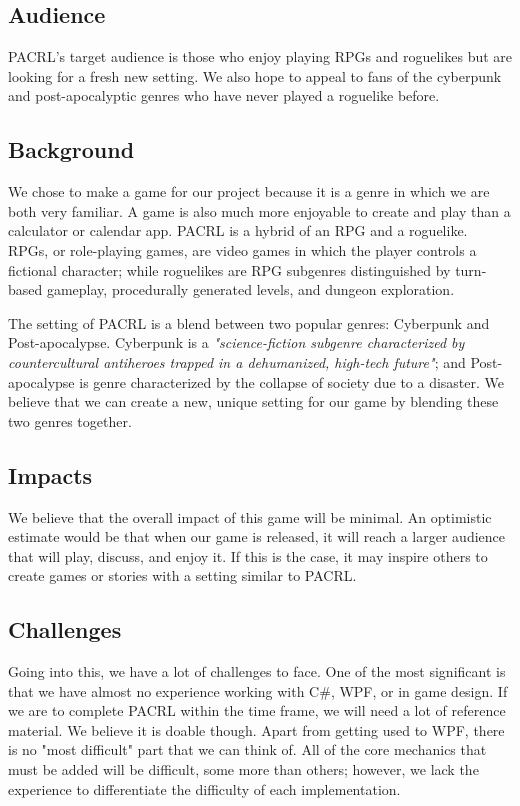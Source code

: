 \documentclass[10pt,conference,onecolumn,compsoc]{IEEEtran}
\begin{document}
\subsection{Audience}
PACRL's target audience is those who enjoy playing RPGs and roguelikes but are looking for a fresh new setting. We also hope to appeal to fans of the cyberpunk and post-apocalyptic genres who have never played a roguelike before. 


\subsection{Background}
We chose to make a game for our project because it is a genre in which we are both very familiar. A game is also much more enjoyable to create and play than a calculator or calendar app. PACRL is a hybrid of an RPG and a roguelike. RPGs, or role-playing games, are video games in which the player controls a fictional character; while roguelikes are RPG subgenres distinguished by turn-based gameplay, procedurally generated levels, and dungeon exploration. 

The setting of PACRL is a blend between two popular genres: Cyberpunk and Post-apocalypse.  Cyberpunk is a \emph{"science-fiction subgenre characterized by countercultural antiheroes trapped in a dehumanized, high-tech future"}\cite{IEEEhowto:cyberpunk}; and Post-apocalypse is genre characterized by the collapse of society due to a disaster. We believe that we can create a new, unique setting for our game by blending these two genres together.

\subsection{Impacts}
We believe that the overall impact of this game will be minimal. An optimistic estimate would be that when our game is released, it will reach a larger audience that will play, discuss, and enjoy it. If this is the case, it may inspire others to create games or stories with a setting similar to PACRL.

\subsection{Challenges}
Going into this, we have a lot of challenges to face. One of the most significant is that we have almost no experience working with C\#, WPF, or in game design. If we are to complete PACRL within the time frame, we will need a lot of reference material. We believe it is doable though. 
Apart from getting used to WPF, there is no "most difficult" part that we can think of. All of the core mechanics that must be added will be difficult, some more than others; however, we lack the experience to differentiate the difficulty of each implementation. 
\end{document}
